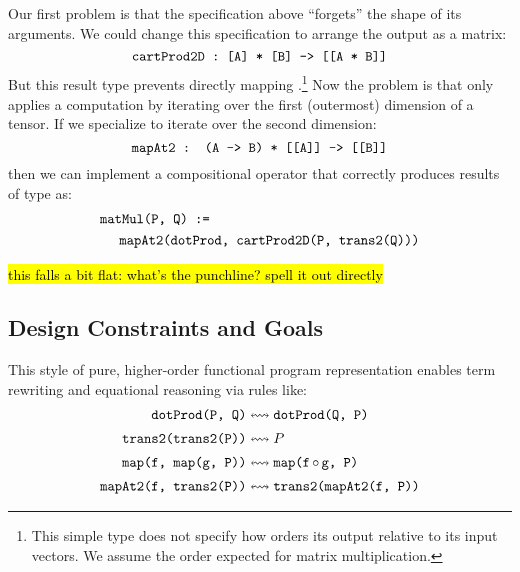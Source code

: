 Our first problem is that
  the  specification above
  ``forgets'' the shape of its arguments.
We could change this specification to
  arrange the output as a matrix:
$$
  \mathrm{\texttt{cartProd2D : [A] * [B] -> [[A * B]]}}
$$
But this result type prevents
  directly mapping .\footnote{
    This simple type does not specify how
     orders its output
    relative to its input vectors.
    We assume the order
    expected for matrix multiplication.}
Now the problem is that 
  only applies a computation by iterating
  over the first (outermost) dimension of a tensor.
If we specialize  to iterate
  over the second dimension:
$$
  \mathrm{\texttt{mapAt2 : (A -> B) * [[A]] -> [[B]]}}
$$
then we can implement a compositional
   operator that correctly produces
  results of type \tcd{[[f64]]} as:
\begin{align*}
  & \mathrm{\texttt{matMul(P, Q) :=}} \\
  & \;\;\;\;\; \mathrm{\texttt{mapAt2(dotProd, cartProd2D(P, trans2(Q)))}}
\end{align*}

\hl{this falls a bit flat: what's the punchline? spell it out directly}

\subsection{\g Design Constraints and Goals}

This style of pure, higher-order functional
  program representation enables
  term rewriting and equational reasoning
  via rules like:
\begin{align*}
  \mcd{dotProd(P, Q)}
    & \leftrightsquigarrow
      \mcd{dotProd(Q, P)} \\[2pt]
  \mcd{trans2(trans2(P))}
    & \leftrightsquigarrow
      P \\[2pt]
  \mcd{map(f, map(g, P))}
    & \leftrightsquigarrow
      \mcd{map(f$\,\circ\,$g, P)} \\[2pt]
  \mcd{mapAt2(f, trans2(P))}
    & \leftrightsquigarrow
      \mcd{trans2(mapAt2(f, P))} %
\end{align*}



